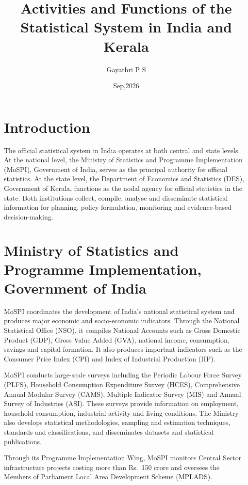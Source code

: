\documentclass[12pt,a4paper]{article}
\title{\textbf{Activities and Functions of the Statistical System in India and Kerala}}
\author{Gayathri P S}
\date{Sep,2026}
\begin{document}
\maketitle

\section{Introduction}

The official statistical system in India operates at both central and state levels. At the national level, the Ministry of Statistics and Programme Implementation (MoSPI), Government of India, serves as the principal authority for official statistics. At the state level, the Department of Economics and Statistics (DES), Government of Kerala, functions as the nodal agency for official statistics in the state. Both institutions collect, compile, analyse and disseminate statistical information for planning, policy formulation, monitoring and evidence-based decision-making.

\section{Ministry of Statistics and Programme Implementation, Government of India}

MoSPI coordinates the development of India's national statistical system and produces major economic and socio-economic indicators. Through the National Statistical Office (NSO), it compiles National Accounts such as Gross Domestic Product (GDP), Gross Value Added (GVA), national income, consumption, savings and capital formation. It also produces important indicators such as the Consumer Price Index (CPI) and Index of Industrial Production (IIP).

MoSPI conducts large-scale surveys including the Periodic Labour Force Survey (PLFS), Household Consumption Expenditure Survey (HCES), Comprehensive Annual Modular Survey (CAMS), Multiple Indicator Survey (MIS) and Annual Survey of Industries (ASI). These surveys provide information on employment, household consumption, industrial activity and living conditions. The Ministry also develops statistical methodologies, sampling and estimation techniques, standards and classifications, and disseminates datasets and statistical publications.

Through its Programme Implementation Wing, MoSPI monitors Central Sector infrastructure projects costing more than Rs.~150 crore and oversees the Members of Parliament Local Area Development Scheme (MPLADS).
\end{document}

